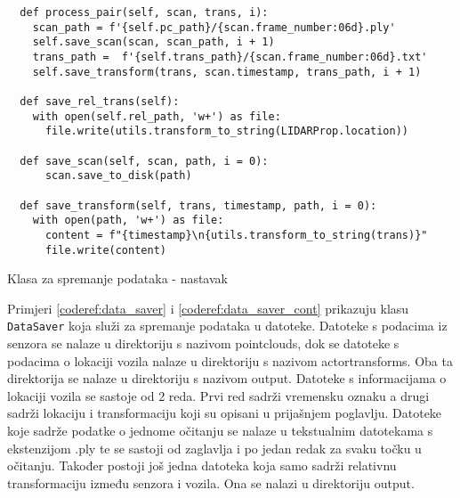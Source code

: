 \begin{listing}[h!]
  \begin{verbatim}
  def process_pair(self, scan, trans, i):
    scan_path = f'{self.pc_path}/{scan.frame_number:06d}.ply'
    self.save_scan(scan, scan_path, i + 1)
    trans_path =  f'{self.trans_path}/{scan.frame_number:06d}.txt'
    self.save_transform(trans, scan.timestamp, trans_path, i + 1)

  def save_rel_trans(self):
    with open(self.rel_path, 'w+') as file:
      file.write(utils.transform_to_string(LIDARProp.location))

  def save_scan(self, scan, path, i = 0):
      scan.save_to_disk(path)

  def save_transform(self, trans, timestamp, path, i = 0):
    with open(path, 'w+') as file:
      content = f"{timestamp}\n{utils.transform_to_string(trans)}"
      file.write(content)
  \end{verbatim}
  \caption{Klasa za spremanje podataka - nastavak}
  \label{coderef:data_saver_cont}
\end{listing}

Primjeri \ref{coderef:data_saver} i \ref{coderef:data_saver_cont} prikazuju klasu \texttt{DataSaver} koja služi za spremanje podataka u datoteke. Datoteke s podacima iz senzora se nalaze u direktoriju s nazivom pointclouds, dok se datoteke s podacima o lokaciji vozila nalaze u direktoriju s nazivom actortransforms. Oba ta direktorija se nalaze u direktoriju s nazivom output. Datoteke s informacijama o lokaciji vozila se sastoje od 2 reda. Prvi red sadrži vremensku oznaku a drugi sadrži lokaciju i transformaciju koji su opisani u prijašnjem poglavlju. Datoteke koje sadrže podatke o jednome očitanju se nalaze u tekstualnim datotekama s ekstenzijom .ply te se sastoji od zaglavlja i po jedan redak za svaku točku u očitanju. Također postoji još jedna datoteka koja samo sadrži relativnu transformaciju između senzora i vozila. Ona se nalazi u direktoriju output.